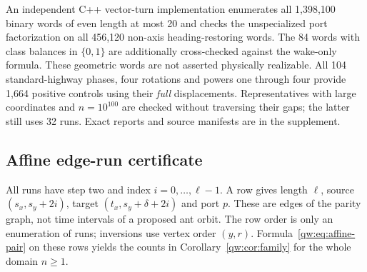 An independent C++ vector-turn implementation enumerates all 1,398,100 binary
words of even length at most 20 and checks the unspecialized port factorization
on all 456,120 non-axis heading-restoring words. The 84 words with class balances
in $\{0,1\}$ are additionally cross-checked against the wake-only formula. These
geometric words are not asserted physically realizable.
All 104 standard-highway phases, four rotations and powers one through four
provide 1,664 positive controls using their \emph{full} displacements.
Representatives with large coordinates and $n=10^{100}$
are checked without traversing their gaps; the latter still uses 32 runs.
Exact reports and source manifests are in the supplement.

\subsection{Affine edge-run certificate}\label{qw:app:runs}
All runs have step two and index $i=0,\ldots,\ell-1$. A row gives length $\ell$,
source $(s_x,s_y+2i)$, target $(t_x,s_y+\delta+2i)$ and port $p$.
These are edges of the parity graph, not time intervals of a proposed ant orbit.
The row order is only an enumeration of runs; inversions use vertex order $(y,r)$.
Formula~\eqref{qw:eq:affine-pair} on these rows yields the counts in
Corollary~\ref{qw:cor:family} for the whole domain $n\ge1$.

